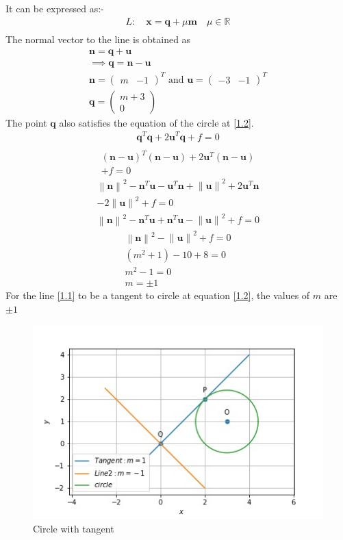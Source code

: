 \documentclass[journal,12pt,twocolumn]{IEEEtran}
\let\vec\mathbf
\numberwithin{equation}{subsection}
\newcommand{\myvec}[1]{\ensuremath{\begin{pmatrix}#1\end{pmatrix}}}
\newcommand{\norm}[1]{\left\lVert#1\right\rVert}
\begin{document}
It can be expressed as:-
\begin{align}
L: \quad \vec{x} = \vec{q} + \mu \vec{m} \quad \mu \in \mathbb{R} \label{2.10} \\
\end{align}
The normal vector to the line is obtained as
\begin{align}
\vec{n} = \vec{q} + \vec{u}\\
\implies \vec{q}  = \vec{n} -  \vec{u}\\
\vec{n} =\myvec{m & -1 }^T  \text{ and } \vec{u} =\myvec{-3 & -1}^T\\
\vec{q} = \myvec{m+3 \\ 0}
\end{align}
The point $\vec{q}$ also satisfies the equation of the circle at \ref{1.2}.
\begin{align}
\vec{q}^T\vec{q}+ 2\vec{u}^T\vec{q} + f = 0 \\
\end{align}
\begin{multline}
(\vec{n} -\vec{ u})^T(\vec{n} -\vec{ u})+2\vec{u}^T(\vec{n} -\vec{ u})\\+f = 0
\end{multline}
\begin{multline}
\norm{\vec{n}}^2 - \vec{n}^T \vec{u} - \vec{u}^T\vec{n} + \norm{\vec{u}}^2  + 2\vec{u}^T\vec{n}\\ -2 \norm{\vec{u}}^2 +f = 0 
\end{multline}
\begin{multline}
\norm{\vec{n}}^2 - \vec{n}^T \vec{u} +\vec{n}^T\vec{u} - \norm{\vec{u}}^2  +f = 0 
\end{multline}
\begin{align}
\norm{\vec{n}}^2 - \norm{\vec{u}}^2  +f = 0\\ 
(m^2 +1) - 10 +8 = 0 \\
m^2 -1 =0\\
m=\pm 1
\end{align}
For the line \ref{1.1} to be a tangent to circle at equation \ref{1.2}, the values of $m$ are $\pm1$
\begin{figure}[!]
\includegraphics[width=1\columnwidth]{CircleTangent.jpg}
\caption{Circle with tangent}
\end{figure}
\end{document}
